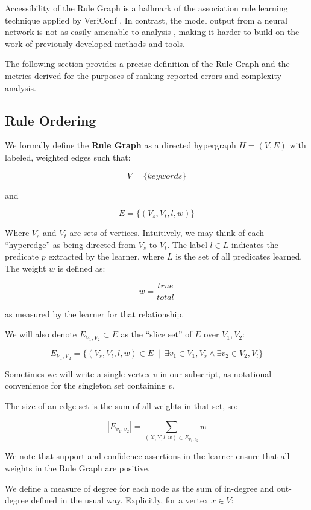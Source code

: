 Accessibility of the Rule Graph is a hallmark of the association rule
learning technique applied by VeriConf \cite{someOtherGraphStuff}.
In contrast, the model output from a neural network is not as easily 
amenable to analysis \cite{nnAnalysis1, nnAnalysis2}, making it harder
to build on the work of previously developed methods and tools.

The following section provides a precise definition of the Rule Graph
and the metrics derived for the purposes of ranking reported errors
and complexity analysis.

\subsection{Rule Ordering}
\label{sec:ruleorder}

We formally define the {\bf Rule Graph} as a directed hypergraph 
$H = (V,E)$ with labeled, weighted edges such that:

    $$V = \{ keywords \}$$

and 

    $$E = \{ (V_s, V_t, l, w) \}$$

Where $V_s$ and $V_t$ are sets of vertices. Intuitively, we may think
of each ``hyperedge'' as being directed from $V_s$ to $V_t$. 
The label $l \in L$ indicates the predicate $p$ extracted by the learner,
where $L$ is the set of all predicates learned. 
The weight $w$ is defined as:

    $$w = \frac{true}{total}$$

as measured by the learner for that relationship. 

We will also denote $E_{V_1, V_2} \subset E$ as the ``slice set'' of $E$ over $V_1, V_2$: 

    $$E_{V_1, V_2} = \{ \left( V_s, V_t, l, w \right) \in E \ \mid \ \exists v_1 \in V_1, V_s \land \exists v_2 \in V_2, V_t \}$$

Sometimes we will write a single vertex $v$ in our subscript, as
notational convenience for the singleton set containing $v$.

The size of an edge set is the sum of all weights in that set, so:

    $$|E_{v_1, v_2}| = \sum_{(X, Y, l, w) \in E_{v_1, v_2}} w$$

We note that support and confidence assertions in the learner ensure
that all weights in the Rule Graph are positive.

We define a measure of degree for each node as the sum of in-degree
and out-degree defined in the usual way. Explicitly, for a vertex $x \in V$:

